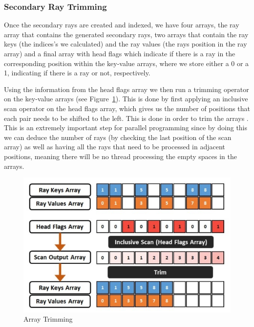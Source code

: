 \subsubsection{Secondary Ray Trimming}

Once the secondary rays are created and indexed, we have four arrays, the ray array that contains the generated secondary rays, two arrays that contain the ray keys (the indices's we calculated) and the ray values (the rays position in the ray array) and a final array with head flags which indicate if there is a ray in the corresponding position within the key-value arrays, where we store either a 0 or a 1, indicating if there is a ray or not, respectively.

\medskip

Using the information from the head flags array we then run a trimming operator on the key-value arrays (see Figure~\ref{fig:at}). This is done by first applying an inclusive scan operator \cite{Merrill09} on the head flags array, which gives us the number of positions that each pair needs to be shifted to the left. This is done in order to trim the arrays \cite{GPUGems2}. This is an extremely important step for parallel programming since by doing this we can deduce the number of rays (by checking the last position of the scan array) as well as having all the rays that need to be processed in adjacent positions, meaning there will be no thread processing the empty spaces in the arrays.

\begin{figure}[!htb]
    \centering
    \includegraphics[scale=0.75]{Images/Array_Trimming}
    \caption{\label{fig:at}Array Trimming}
\end{figure}

